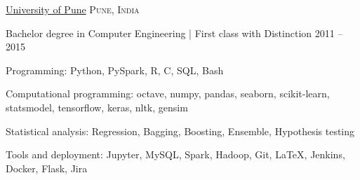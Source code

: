 \documentclass[10pt,a4paper]{article}
\begin{document}
\spacedhrule{0.9em}{-0.4em}




\headedsection
  {\href{}{University of Pune}}
  {\textsc{Pune, India}} {%
  \headedsubsection
    {Bachelor degree in Computer Engineering | First class with Distinction}
    {2011 -- 2015}

}

\spacedhrule{0.9em}{-0.4em}



\inlineheadsection  %
 {Programming:}
{Python, PySpark, R, C, SQL, Bash}
\vspace{0.6em}

\inlineheadsection
 {Computational programming:}
{octave, numpy, pandas, seaborn, scikit-learn, statsmodel, tensorflow, keras, nltk, gensim}
\vspace{0.6em}

\inlineheadsection
 {Statistical analysis:}
{Regression, Bagging, Boosting, Ensemble, Hypothesis testing}
\vspace{0.6em}

\inlineheadsection
  {Tools and deployment:}
  {Jupyter, MySQL, Spark, Hadoop, Git, \LaTeX, Jenkins, Docker, Flask, Jira}
\end{document}
